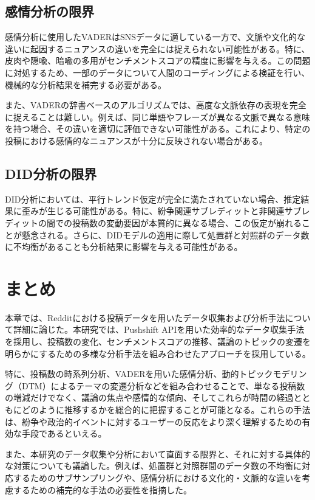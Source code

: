 \documentclass[11pt, a4j]{jreport}
\begin{document}
    \subsection{感情分析の限界}
    感情分析に使用したVADERはSNSデータに適している一方で、文脈や文化的な違いに起因するニュアンスの違いを完全には捉えられない可能性がある。特に、皮肉や隠喩、暗喩の多用がセンチメントスコアの精度に影響を与える。この問題に対処するため、一部のデータについて人間のコーディングによる検証を行い、機械的な分析結果を補完する必要がある。
    
    また、VADERの辞書ベースのアルゴリズムでは、高度な文脈依存の表現を完全に捉えることは難しい。例えば、同じ単語やフレーズが異なる文脈で異なる意味を持つ場合、その違いを適切に評価できない可能性がある。これにより、特定の投稿における感情的なニュアンスが十分に反映されない場合がある。
    
    \subsection{DID分析の限界}
    DID分析においては、平行トレンド仮定が完全に満たされていない場合、推定結果に歪みが生じる可能性がある。特に、紛争関連サブレディットと非関連サブレディットの間での投稿数の変動要因が本質的に異なる場合、この仮定が崩れることが懸念される。さらに、DIDモデルの適用に際して処置群と対照群のデータ数に不均衡があることも分析結果に影響を与える可能性がある。

    \section{まとめ}
    本章では、Redditにおける投稿データを用いたデータ収集および分析手法について詳細に論じた。本研究では、Pushshift APIを用いた効率的なデータ収集手法を採用し、投稿数の変化、センチメントスコアの推移、議論のトピックの変遷を明らかにするための多様な分析手法を組み合わせたアプローチを採用している。

    特に、投稿数の時系列分析、VADERを用いた感情分析、動的トピックモデリング（DTM）によるテーマの変遷分析などを組み合わせることで、単なる投稿数の増減だけでなく、議論の焦点や感情的な傾向、そしてこれらが時間の経過とともにどのように推移するかを総合的に把握することが可能となる。これらの手法は、紛争や政治的イベントに対するユーザーの反応をより深く理解するための有効な手段であるといえる。

    また、本研究のデータ収集や分析において直面する限界と、それに対する具体的な対策についても議論した。例えば、処置群と対照群間のデータ数の不均衡に対応するためのサブサンプリングや、感情分析における文化的・文脈的な違いを考慮するための補完的な手法の必要性を指摘した。
\end{document}
